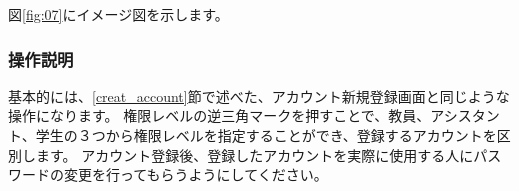 図\ref{fig:07}にイメージ図を示します。

\subsubsection{操作説明}
基本的には、\ref{creat_account}節で述べた、アカウント新規登録画面と同じような操作になります。
権限レベルの逆三角マークを押すことで、教員、アシスタント、学生の３つから権限レベルを指定することができ、登録するアカウントを区別します。
アカウント登録後、登録したアカウントを実際に使用する人にパスワードの変更を行ってもらうようにしてください。



